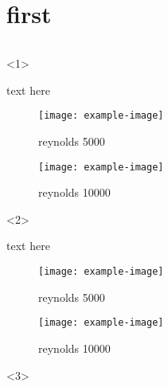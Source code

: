\documentclass{beamer}
\begin{document}
\section{first}

\begin{frame}
    \begin{columns}[onlytextwidth]
        \vrule{}%
        \begin{column}{.85\textwidth}%
            \begin{onlyenv}<1>%
                \begin{minipage}{1\textwidth}%
                    text here%
                \end{minipage}%
                \begin{figure}%
                    \begin{minipage}{.475\textwidth}%
                        \texttt{[image: example-image]}%
                        \caption{reynolds 5000}%
                    \end{minipage}%
                    \begin{minipage}{.475\textwidth}%
                        \texttt{[image: example-image]}%
                        \caption{reynolds 10000}%
                    \end{minipage}%
                \end{figure}%
            \end{onlyenv}%
            \begin{onlyenv}<2>%
                \begin{minipage}{1\textwidth}%
                    text here%
                \end{minipage}%
                \begin{figure}%
                    \begin{minipage}{.475\textwidth}%
                        \texttt{[image: example-image]}%
                        \caption{reynolds 5000}%
                    \end{minipage}%
                    \begin{minipage}{.475\textwidth}%
                        \texttt{[image: example-image]}%
                        \caption{reynolds 10000}%
                    \end{minipage}%
                \end{figure}%
            \end{onlyenv}%
            \begin{onlyenv}<3>%

\end{onlyenv}
\end{column}
\end{columns}
\end{frame}
\end{document}
